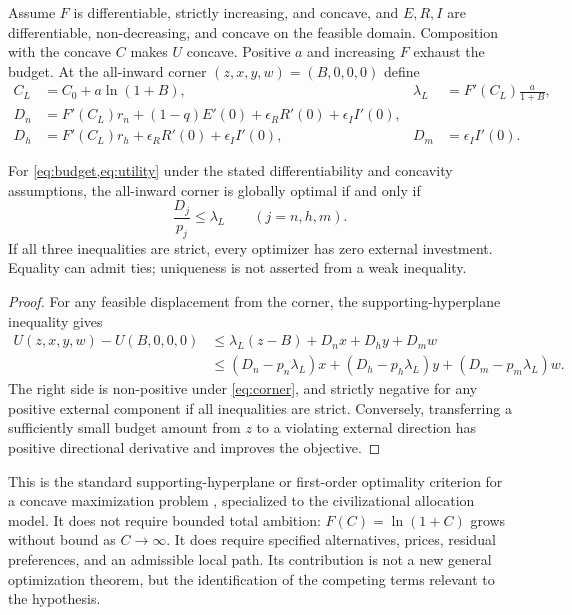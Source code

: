 Assume $F$ is differentiable, strictly increasing, and concave, and $E,R,I$ are differentiable, non-decreasing, and concave on the feasible domain. Composition with the concave $C$ makes $U$ concave. Positive $a$ and increasing $F$ exhaust the budget. At the all-inward corner $(z,x,y,w)=(B,0,0,0)$ define
\begin{align}
 C_L&=C_0+a\ln(1+B),&
 \lambda_L&=F'(C_L)\frac{a}{1+B},\label{eq:local-return}\\
 D_n&=F'(C_L)r_n+(1-q)E'(0)+\epsilon_RR'(0)+\epsilon_II'(0),\nonumber\\
 D_h&=F'(C_L)r_h+\epsilon_RR'(0)+\epsilon_II'(0),&
 D_m&=\epsilon_II'(0).\label{eq:external-return}
\end{align}

\begin{proposition}
\label{prop:corner}
For \cref{eq:budget,eq:utility} under the stated differentiability and concavity assumptions, the all-inward corner is globally optimal if and only if
\begin{equation}
 \frac{D_j}{p_j}\leq\lambda_L\qquad(j=n,h,m).
 \label{eq:corner}
\end{equation}
If all three inequalities are strict, every optimizer has zero external investment. Equality can admit ties; uniqueness is not asserted from a weak inequality.
\end{proposition}
\begin{proof}
For any feasible displacement from the corner, the supporting-hyperplane inequality gives
\begin{align}
 U(z,x,y,w)-U(B,0,0,0)
 &\leq\lambda_L(z-B)+D_nx+D_hy+D_mw\nonumber\\
 &\leq(D_n-p_n\lambda_L)x+(D_h-p_h\lambda_L)y
 +(D_m-p_m\lambda_L)w.
 \label{eq:cornerproof}
\end{align}
The right side is non-positive under \cref{eq:corner}, and strictly negative for any positive external component if all inequalities are strict. Conversely, transferring a sufficiently small budget amount from $z$ to a violating external direction has positive directional derivative and improves the objective.
\end{proof}

This is the standard supporting-hyperplane or first-order optimality criterion for a concave maximization problem \citep[chapters 3--5]{BoydVandenberghe2004}, specialized to the civilizational allocation model. It does not require bounded total ambition: $F(C)=\ln(1+C)$ grows without bound as $C\to\infty$. It does require specified alternatives, prices, residual preferences, and an admissible local path. Its contribution is not a new general optimization theorem, but the identification of the competing terms relevant to the hypothesis.

